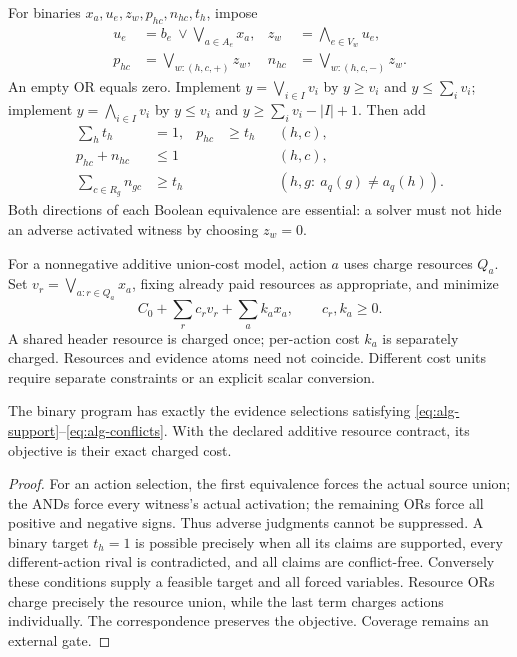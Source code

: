 For binaries $x_a,u_e,z_w,p_{hc},n_{hc},t_h$, impose
\begin{align}
 u_e&=b_e\ \vee\!\bigvee_{a\in A_e}x_a,
 &z_w&=\bigwedge_{e\in V_w}u_e, \label{eq:alg-circuit}\\
 p_{hc}&=\bigvee_{w:(h,c,+)}z_w,
 &n_{hc}&=\bigvee_{w:(h,c,-)}z_w. \nonumber
\end{align}
An empty OR equals zero. Implement $y=\bigvee_{i\in I}v_i$ by
$y\geq v_i$ and $y\leq\sum_i v_i$; implement
$y=\bigwedge_{i\in I}v_i$ by $y\leq v_i$ and
$y\geq\sum_i v_i-|I|+1$. Then add
\begin{align}
 \sum_h t_h&=1,& p_{hc}&\geq t_h &&(h,c),\nonumber\\
 p_{hc}+n_{hc}&\leq1 &&&&(h,c),\label{eq:alg-milp}\\
 \sum_{c\in R_g}n_{gc}&\geq t_h
 &&&&(h,g:\ a_q(g)\neq a_q(h)).\nonumber
\end{align}
Both directions of each Boolean equivalence are essential: a solver must
not hide an adverse activated witness by choosing $z_w=0$.

For a nonnegative additive union-cost model, action $a$ uses charge resources
$Q_a$. Set $v_r=\bigvee_{a:r\in Q_a}x_a$, fixing already paid resources as
appropriate, and minimize
\begin{equation}
 C_0+\sum_r c_r v_r+\sum_a k_a x_a,
 \qquad c_r,k_a\geq0.\label{eq:alg-unioncost}
\end{equation}
A shared header resource is charged once; per-action cost $k_a$ is separately
charged. Resources and evidence atoms need not coincide. Different cost
units require separate constraints or an explicit scalar conversion.

\begin{proposition}
The binary program has exactly the evidence selections satisfying
\eqref{eq:alg-support}--\eqref{eq:alg-conflicts}. With the declared additive
resource contract, its objective is their exact charged cost.
\end{proposition}
\begin{proof}
For an action selection, the first equivalence forces the actual source
union; the ANDs force every witness's actual activation; the remaining ORs
force all positive and negative signs. Thus adverse judgments cannot be
suppressed. A binary target $t_h=1$ is possible precisely when all its claims
are supported, every different-action rival is contradicted, and all claims
are conflict-free. Conversely these conditions supply a feasible target and
all forced variables. Resource ORs charge precisely the resource union, while
the last term charges actions individually. The correspondence preserves
the objective. Coverage remains an external gate.
\end{proof}

